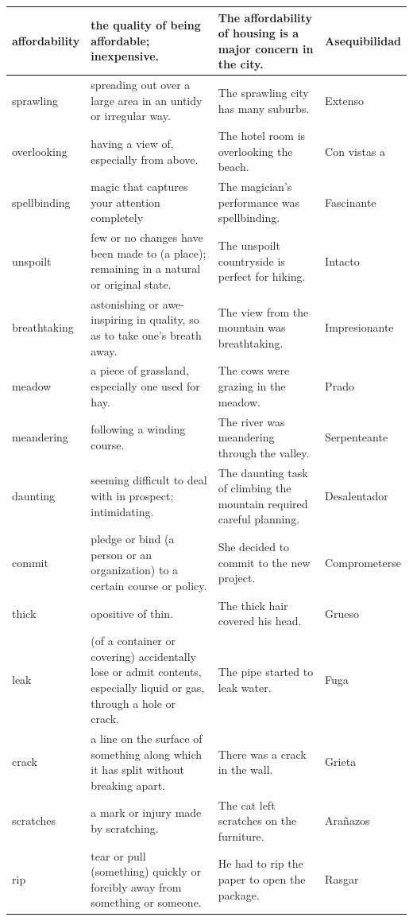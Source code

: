 \begin{longtable}{p{}p{}p{}p{}}
\hline
affordability & the quality of being affordable; inexpensive. & The affordability of housing is a major concern in the city. & Asequibilidad \\
\hline
sprawling & spreading out over a large area in an untidy or irregular way. & The sprawling city has many suburbs. & Extenso \\
\hline
overlooking & having a view of, especially from above. & The hotel room is overlooking the beach. & Con vistas a \\
\hline 
spellbinding & magic that captures your attention completely & The magician's performance was spellbinding. & Fascinante \\
\hline
unspoilt & few or no changes have been made to (a place); remaining in a natural or original state. & The unspoilt countryside is perfect for hiking. & Intacto \\
\hline
breathtaking & astonishing or awe-inspiring in quality, so as to take one's breath away. & The view from the mountain was breathtaking. & Impresionante \\
\hline
meadow & a piece of grassland, especially one used for hay. & The cows were grazing in the meadow. & Prado \\
\hline
meandering & following a winding course. & The river was meandering through the valley. & Serpenteante \\
\hline
daunting & seeming difficult to deal with in prospect; intimidating. & The daunting task of climbing the mountain required careful planning. & Desalentador \\
\hline
commit & pledge or bind (a person or an organization) to a certain course or policy. & She decided to commit to the new project. & Comprometerse \\
\hline
thick & opositive of thin. & The thick hair covered his head. & Grueso \\
\hline
leak & (of a container or covering) accidentally lose or admit contents, especially liquid or gas, through a hole or crack. & The pipe started to leak water. & Fuga \\
\hline
crack & a line on the surface of something along which it has split without breaking apart. & There was a crack in the wall. & Grieta \\
\hline
scratches & a mark or injury made by scratching. & The cat left scratches on the furniture. & Arañazos \\
\hline
rip & tear or pull (something) quickly or forcibly away from something or someone. & He had to rip the paper to open the package. & Rasgar \\

\end{longtable}
